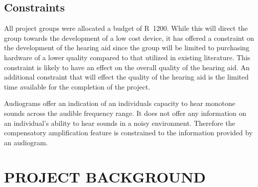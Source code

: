 \documentclass[10pt,twocolumn]{witseiepaper}
\begin{document}
\subsection{Constraints}
All project groups were allocated a budget of R~1200. While this will direct the group towards the development of a low cost device, it has offered a constraint on the development of the hearing aid since the group will be limited to purchasing hardware of a lower quality compared to that utilized in existing literature. This constraint is likely to have an effect on the overall quality of the hearing aid. An additional constraint that will effect the quality of the hearing aid is the limited time available for the completion of the project. 

Audiograms offer an indication of an individuals capacity to hear monotone sounds across the audible frequency range. It does not offer any information on an individual's ability to hear sounds in a noisy environment. Therefore the compensatory amplification feature is constrained to the information provided by an audiogram. 

\section{PROJECT BACKGROUND}
\end{document}

